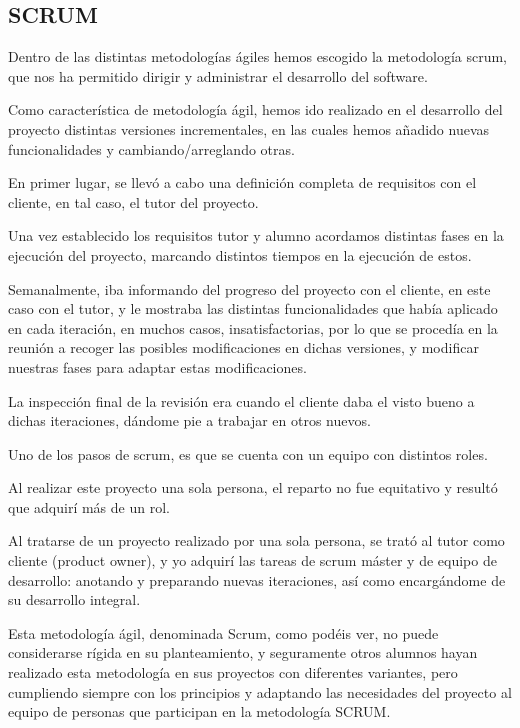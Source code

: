 \subsection{SCRUM}



Dentro de las distintas metodologías ágiles hemos escogido la metodología scrum, que nos ha permitido dirigir y administrar el desarrollo del software.

Como característica de metodología ágil, hemos ido realizado en el desarrollo del proyecto distintas versiones incrementales, en las cuales hemos añadido nuevas funcionalidades y cambiando/arreglando otras\cite{SCRUM}.

En primer lugar, se llevó a cabo una definición completa de requisitos con el cliente, en tal caso, el tutor del proyecto.

 Una vez establecido los requisitos tutor y alumno acordamos distintas fases en la ejecución del proyecto, marcando distintos tiempos en la ejecución de estos.

Semanalmente, iba informando del progreso del proyecto con el cliente, en este caso con el tutor, y le mostraba las distintas funcionalidades que había aplicado en cada iteración, en muchos casos, insatisfactorias, por lo que se procedía en la reunión a recoger las posibles modificaciones en dichas versiones, y modificar nuestras fases para adaptar estas modificaciones. 

La inspección final de la revisión era cuando el cliente daba el visto bueno a dichas iteraciones, dándome pie a trabajar en otros nuevos.

Uno de los pasos de scrum, es que se cuenta con un equipo con distintos roles. 

Al realizar este proyecto una sola persona, el reparto no fue equitativo y resultó que adquirí más de un rol. 

Al tratarse de un proyecto realizado por una sola persona, se trató al tutor como cliente (product owner), y yo adquirí las tareas de scrum máster y de equipo de desarrollo: anotando y preparando nuevas iteraciones, así como encargándome de su desarrollo integral.


Esta metodología ágil, denominada Scrum, como podéis ver, no puede considerarse rígida en su planteamiento, y seguramente otros alumnos hayan realizado esta metodología en sus proyectos con diferentes variantes, pero cumpliendo siempre con los principios y adaptando las necesidades del proyecto al equipo de personas que participan en la metodología SCRUM.
\newpage
